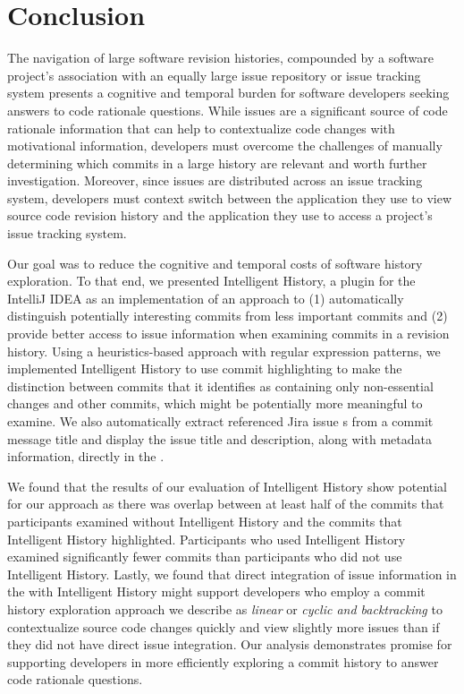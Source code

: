 \chapter{Conclusion}
\label{ch:Conclusion}

The navigation of large software revision histories, compounded by a software
project's association with an equally large issue repository or issue tracking system
presents a cognitive and temporal burden for software developers seeking 
answers to code rationale questions.
While issues are a significant source of code rationale information that
can help to contextualize code changes with motivational information,
developers must overcome the challenges of manually determining
which commits in a large history are relevant and worth further investigation.
Moreover, since issues are distributed across an issue tracking system,
developers must context switch between the application they use to view
source code revision history and the application they use to access a project's issue tracking system.

Our goal was to reduce the cognitive and temporal costs of software history exploration.
To that end, we presented Intelligent History, a plugin for the IntelliJ IDEA 
as an implementation of an approach to (1) automatically distinguish potentially interesting
commits from less important commits and (2) provide better access to issue information 
when examining commits in a revision history.
Using a heuristics-based approach with regular expression patterns, 
we implemented Intelligent History to use commit highlighting 
to make the distinction between commits that it identifies as containing
only non-essential changes and other commits, which might be potentially more meaningful to examine.
We also automatically extract referenced Jira issue s from a commit message title
and display the issue title and description, along with metadata information, directly in the .

We found that the results of our evaluation of Intelligent History show
potential for our approach as there was overlap between at least half of the commits
that participants examined without Intelligent History and the commits that Intelligent History
highlighted. Participants who used Intelligent History examined significantly
fewer commits than participants who did not use Intelligent History.
Lastly, we found that direct integration of issue information in the 
with Intelligent History might support developers who employ a commit history exploration approach
we describe as \textit{linear} or \textit{cyclic and backtracking} to contextualize
source code changes quickly and view slightly more issues than if they did not have
direct issue integration.
Our analysis demonstrates promise for supporting developers in more
efficiently exploring a commit history to answer code rationale questions.